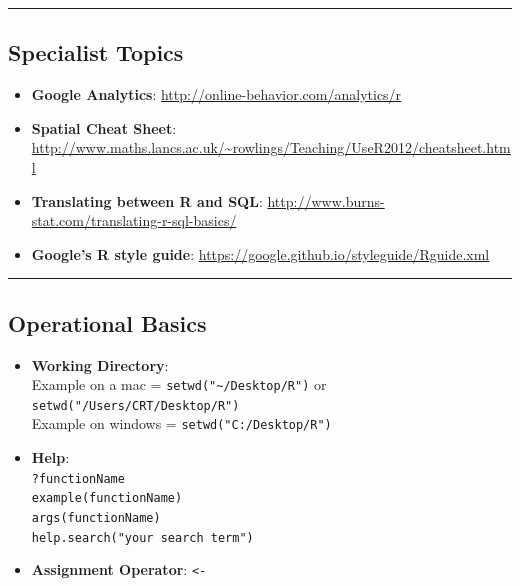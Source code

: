 \documentclass[]{book}
\providecommand{\tightlist}{%
  \setlength{\itemsep}{0pt}\setlength{\parskip}{0pt}}
\begin{document}
\begin{center}\rule{0.5\linewidth}{0.5pt}\end{center}

\hypertarget{specialist-topics}{%
\subsection{Specialist Topics}\label{specialist-topics}}

\begin{itemize}
\tightlist
\item
  \textbf{Google Analytics}: \url{http://online-behavior.com/analytics/r}
\item
  \textbf{Spatial Cheat Sheet}: \url{http://www.maths.lancs.ac.uk/~rowlings/Teaching/UseR2012/cheatsheet.html}
\item
  \textbf{Translating between R and SQL}: \url{http://www.burns-stat.com/translating-r-sql-basics/}
\item
  \textbf{Google's R style guide}: \url{https://google.github.io/styleguide/Rguide.xml}
\end{itemize}

\begin{center}\rule{0.5\linewidth}{0.5pt}\end{center}

\hypertarget{operational-basics}{%
\subsection{Operational Basics}\label{operational-basics}}

\begin{itemize}
\tightlist
\item
  \textbf{Working Directory}:\\
  Example on a mac = \texttt{setwd("\textasciitilde{}/Desktop/R")} or \texttt{setwd("/Users/CRT/Desktop/R")}\\
  Example on windows = \texttt{setwd("C:/Desktop/R")}\\
\item
  \textbf{Help}:\\
  \texttt{?functionName}~\\
  \texttt{example(functionName)}~\\
  \texttt{args(functionName)}~\\
  \texttt{help.search("your\ search\ term")}~\\
\item
  \textbf{Assignment Operator}: \texttt{\textless{}-}
\end{itemize}
\end{document}
